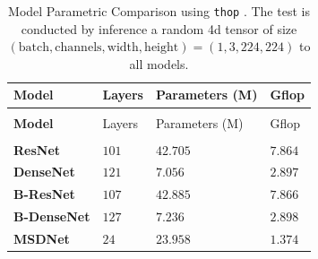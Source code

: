 \begin{longtabu}{>{\bfseries}X|X[r]|X[r]|X[r]}
	\caption[Model Parametric Comparison]{Model Parametric Comparison using \texttt{thop} \cite{zhu_thop_nodate}. The test is conducted by inference a random 4d tensor of size $ (\mathrm{batch,channels,width,height})=(1,3,224,224) $ to all models.}  \label{} \\
	\toprule
	\rowfont{\bfseries}
	Model & Layers & Parameters (M) & G\gls{flop} \tabularnewline
	\hline
	\endfirsthead
	\\
	\toprule
	\rowfont{\bfseries}
	Model & Layers & Parameters (M) & G\gls{flop} \tabularnewline
	\hline
	\endhead %
	\hline
	\\
	\endfoot
	\hline
	\endlastfoot
	ResNet & $ 101 $ & $ 42.705 $ & $ 7.864 $ \tabularnewline
	\hline
	DenseNet & $ 121 $ & $ 7.056 $ & $ 2.897 $ \tabularnewline
	\hline
	B-ResNet & $ 107 $ & $ 42.885 $ & $ 7.866 $ \tabularnewline
	\hline
	B-DenseNet & $ 127 $ & $ 7.236 $ & $ 2.898 $\tabularnewline
	\hline
	MSDNet & $ 24 $ & $ 23.958 $ & $ 1.374 $ \tabularnewline
	\bottomrule
\end{longtabu}









% 